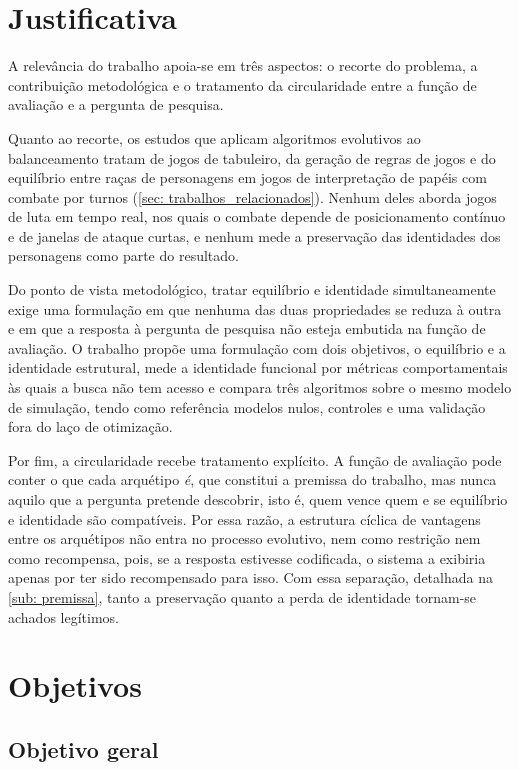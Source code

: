 \section{Justificativa}

A relevância do trabalho apoia-se em três aspectos: o recorte do problema, a contribuição metodológica e o tratamento da circularidade entre a função de avaliação e a pergunta de pesquisa.

Quanto ao recorte, os estudos que aplicam algoritmos evolutivos ao balanceamento tratam de jogos de tabuleiro, da geração de regras de jogos e do equilíbrio entre raças de personagens em jogos de interpretação de papéis com combate por turnos (\autoref{sec: trabalhos_relacionados}). Nenhum deles aborda jogos de luta em tempo real, nos quais o combate depende de posicionamento contínuo e de janelas de ataque curtas, e nenhum mede a preservação das identidades dos personagens como parte do resultado.

Do ponto de vista metodológico, tratar equilíbrio e identidade simultaneamente exige uma formulação em que nenhuma das duas propriedades se reduza à outra e em que a resposta à pergunta de pesquisa não esteja embutida na função de avaliação. O trabalho propõe uma formulação com dois objetivos, o equilíbrio e a identidade estrutural, mede a identidade funcional por métricas comportamentais às quais a busca não tem acesso e compara três algoritmos sobre o mesmo modelo de simulação, tendo como referência modelos nulos, controles e uma validação fora do laço de otimização.

Por fim, a circularidade recebe tratamento explícito. A função de avaliação pode conter o que cada arquétipo \textit{é}, que constitui a premissa do trabalho, mas nunca aquilo que a pergunta pretende descobrir, isto é, quem vence quem e se equilíbrio e identidade são compatíveis. Por essa razão, a estrutura cíclica de vantagens entre os arquétipos não entra no processo evolutivo, nem como restrição nem como recompensa, pois, se a resposta estivesse codificada, o sistema a exibiria apenas por ter sido recompensado para isso. Com essa separação, detalhada na \autoref{sub: premissa}, tanto a preservação quanto a perda de identidade tornam-se achados legítimos.

\section{Objetivos}

\subsection{Objetivo geral}

